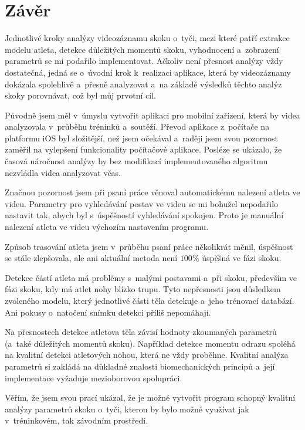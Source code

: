 \chapter*{Závěr}

Jednotlivé kroky analýzy videozáznamu skoku o~tyči, mezi které patří extrakce modelu atleta, detekce důležitých momentů skoku, vyhodnocení a~zobrazení parametrů se mi podařilo implementovat. Ačkoliv není přesnost analýzy vždy dostatečná, jedná se o~úvodní krok k~realizaci aplikace, která by videozáznamy dokázala spolehlivě a~přesně analyzovat a~na základě výsledků těchto analýz skoky porovnávat, což byl můj prvotní cíl.

Původně jsem měl v~úmyslu vytvořit aplikaci pro mobilní zařízení, která by videa analyzovala v~průběhu tréninků a~soutěží. Převod aplikace z~počítače na platformu iOS byl složitější, než jsem očekával a~raději jsem svou pozornost zaměřil na vylepšení funkcionality počítačové aplikace. Posléze se ukázalo, že časová náročnost analýzy by bez modifikací implementovaného algoritmu nezvládla videa analyzovat včas.

Značnou pozornost jsem při psaní práce věnoval automatickému nalezení atleta ve videu. Parametry pro vyhledávání postav ve videu se mi bohužel nepodařilo nastavit tak, abych byl s~úspěšností vyhledávání spokojen. Proto je manuální nalezení atleta ve videu výchozím nastavením programu.

Způsob trasování atleta jsem v~průběhu psaní práce několikrát měnil, úspěšnost se stále zlepšovala, ale ani aktuální metoda není $100\%$ úspěšná ve fázi skoku.

Detekce částí atleta má problémy s~malými postavami a~při skoku, především ve fázi skoku, kdy má atlet nohy blízko trupu. Tyto nepřesnosti jsou důsledkem zvoleného modelu, který jednotlivé části těla detekuje a~jeho trénovací databází. Ani pokusy o~natočení snímku detekci příliš nepomáhají.

Na přesnostech detekce atletova těla závisí hodnoty zkoumaných parametrů (a~také důležitých momentů skoku). Například detekce momentu odrazu spoléhá na kvalitní detekci atletových nohou, která ne vždy proběhne. Kvalitní analýza parametrů si zakládá na důkladné znalosti biomechanických principů a~její implementace vyžaduje mezioborovou spolupráci.

Věřím, že jsem svou prací ukázal, že je možné vytvořit program schopný kvalitní analýzy parametrů skoku o~tyči, kterou by bylo možné využívat jak v~tréninkovém, tak závodním prostředí.




